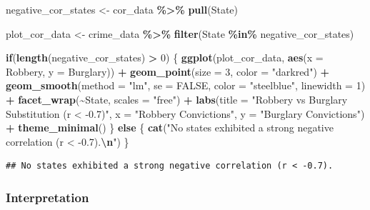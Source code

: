 \documentclass[
]{article}
\newenvironment{Shaded}{\begin{snugshade}}{\end{snugshade}}
\newcommand{\AttributeTok}[1]{\textcolor[rgb]{0.13,0.29,0.53}{#1}}
\newcommand{\ConstantTok}[1]{\textcolor[rgb]{0.56,0.35,0.01}{#1}}
\newcommand{\ControlFlowTok}[1]{\textcolor[rgb]{0.13,0.29,0.53}{\textbf{#1}}}
\newcommand{\DecValTok}[1]{\textcolor[rgb]{0.00,0.00,0.81}{#1}}
\newcommand{\FunctionTok}[1]{\textcolor[rgb]{0.13,0.29,0.53}{\textbf{#1}}}
\newcommand{\NormalTok}[1]{#1}
\newcommand{\OtherTok}[1]{\textcolor[rgb]{0.56,0.35,0.01}{#1}}
\newcommand{\SpecialCharTok}[1]{\textcolor[rgb]{0.81,0.36,0.00}{\textbf{#1}}}
\newcommand{\StringTok}[1]{\textcolor[rgb]{0.31,0.60,0.02}{#1}}
\begin{document}
\begin{Shaded}
\begin{Highlighting}[]
\NormalTok{negative\_cor\_states }\OtherTok{\textless{}{-}}\NormalTok{ cor\_data }\SpecialCharTok{\%\textgreater{}\%} \FunctionTok{pull}\NormalTok{(State)}

\NormalTok{plot\_cor\_data }\OtherTok{\textless{}{-}}\NormalTok{ crime\_data }\SpecialCharTok{\%\textgreater{}\%}
  \FunctionTok{filter}\NormalTok{(State }\SpecialCharTok{\%in\%}\NormalTok{ negative\_cor\_states)}

\ControlFlowTok{if}\NormalTok{(}\FunctionTok{length}\NormalTok{(negative\_cor\_states) }\SpecialCharTok{\textgreater{}} \DecValTok{0}\NormalTok{) \{}
  \FunctionTok{ggplot}\NormalTok{(plot\_cor\_data, }\FunctionTok{aes}\NormalTok{(}\AttributeTok{x =}\NormalTok{ Robbery, }\AttributeTok{y =}\NormalTok{ Burglary)) }\SpecialCharTok{+}
    \FunctionTok{geom\_point}\NormalTok{(}\AttributeTok{size =} \DecValTok{3}\NormalTok{, }\AttributeTok{color =} \StringTok{"darkred"}\NormalTok{) }\SpecialCharTok{+}
    \FunctionTok{geom\_smooth}\NormalTok{(}\AttributeTok{method =} \StringTok{"lm"}\NormalTok{, }\AttributeTok{se =} \ConstantTok{FALSE}\NormalTok{, }\AttributeTok{color =} \StringTok{"steelblue"}\NormalTok{, }\AttributeTok{linewidth =} \DecValTok{1}\NormalTok{) }\SpecialCharTok{+}
    \FunctionTok{facet\_wrap}\NormalTok{(}\SpecialCharTok{\textasciitilde{}}\NormalTok{State, }\AttributeTok{scales =} \StringTok{"free"}\NormalTok{) }\SpecialCharTok{+}
    \FunctionTok{labs}\NormalTok{(}\AttributeTok{title =} \StringTok{"Robbery vs Burglary Substitution (r \textless{} {-}0.7)"}\NormalTok{,}
         \AttributeTok{x =} \StringTok{"Robbery Convictions"}\NormalTok{, }\AttributeTok{y =} \StringTok{"Burglary Convictions"}\NormalTok{) }\SpecialCharTok{+}
    \FunctionTok{theme\_minimal}\NormalTok{()}
\NormalTok{\} }\ControlFlowTok{else}\NormalTok{ \{}
  \FunctionTok{cat}\NormalTok{(}\StringTok{"No states exhibited a strong negative correlation (r \textless{} {-}0.7).}\SpecialCharTok{\textbackslash{}n}\StringTok{"}\NormalTok{)}
\NormalTok{\}}
\end{Highlighting}
\end{Shaded}

\begin{verbatim}
## No states exhibited a strong negative correlation (r < -0.7).
\end{verbatim}

\subsubsection{Interpretation}\label{interpretation-4}
\end{document}
